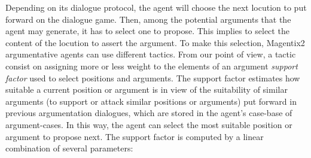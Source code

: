 Depending on its dialogue protocol, the agent will choose the next locution to put forward on the dialogue game. Then, among the potential arguments that the agent may generate, it has to select one to propose. This implies to select the content of the locution to assert the argument. To make this selection, Magentix2 argumentative agents can use different tactics. From our point of view, a tactic consist on assigning more or less weight to the elements of an argument \emph{support factor} used to select positions and arguments. The support factor estimates how suitable a current position or argument is in view of the suitability of similar arguments (to support or attack similar positions or arguments) put forward in previous argumentation dialogues, which are stored in the agent's case-base of argument-cases. In this way, the agent can select the most suitable position or argument to propose next. The support factor is computed by a linear combination of several parameters:

